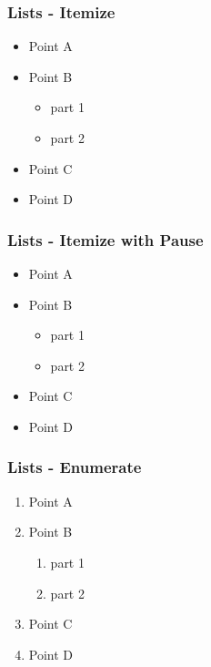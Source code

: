 \label{itemize}
\begin{frame}\frametitle{Lists - Itemize}
  \begin{itemize}
    \item Point A
    \item Point B
    \begin{itemize}
      \item part 1
      \item part 2
    \end{itemize}
    \item Point C
    \item Point D
  \end{itemize}
\end{frame}

\label{pause}
\begin{frame}\frametitle{Lists - Itemize with Pause}
  \begin{itemize}
    \pause \item Point A
    \pause \item Point B
    \begin{itemize}
      \pause \item part 1
      \pause \item part 2
    \end{itemize}
    \pause \item Point C
    \pause \item Point D
  \end{itemize}
\end{frame}

\label{enumerate}
\begin{frame}\frametitle{Lists - Enumerate}
  \begin{enumerate}
    \item Point A
    \item Point B
    \begin{enumerate}
      \item part 1
      \item part 2
    \end{enumerate}
    \item Point C
    \item Point D
  \end{enumerate}
\end{frame}

